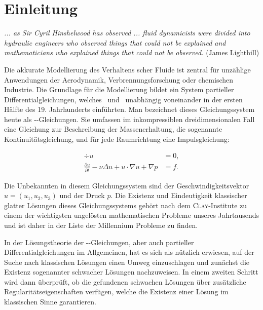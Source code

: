 \chapter*{Einleitung}

\begin{addmargin}[2em]{2em}%
  \textit{... as Sir Cyril Hinshelwood has observed ... fluid dynamicists
were divided into hydraulic engineers who observed things that
could not be explained and mathematicians who explained things
that could not be observed.} 
  \flushright(James Lighthill)
\end{addmargin}
\vspace{1.5cm}

Die akkurate Modellierung des Verhaltens \newton scher Fluide ist zentral für unzählige Anwendungen der Aerodynamik, Verbrennungsforschung oder chemischen Industrie.
Die Grundlage für die Modellierung bildet ein System partieller Differentialgleichungen, welches \navier\ und \stokes\ unabhängig voneinander in der ersten Hälfte des 19. Jahrhunderts einführten. 
Man bezeichnet dieses Gleichungssystem heute als \navier\hyp\stokes\hyp{}Gleichungen.
Sie umfassen im inkompressiblen dreidimensionalen Fall eine Gleichung zur Beschreibung der Massenerhaltung, die sogenannte Kontinuitätsgleichung, und für jede Raumrichtung eine Impulsgleichung:

\begin{align*}
  \div u &= 0, \\
  \frac{\partial u}{\partial t} - \nu \Delta u + u \cdot \nabla u + \nabla p &= f.
\end{align*}

Die Unbekannten in diesem Gleichungssystem sind der Geschwindigkeitsvektor $u = (u_1, u_2, u_3)$ und der Druck $p$.
Die Existenz und Eindeutigkeit klassischer glatter Lösungen dieses Gleichungssystems gehört nach dem \textsc{Clay}\hyp{}Institute zu einem der wichtigsten ungelösten mathematischen Probleme unseres Jahrtausends und ist daher in der Liste der Millennium Probleme zu finden.

In der Lösungstheorie der \navier\hyp\stokes\hyp{}Gleichungen, aber auch partieller Differentialgleichungen im Allgemeinen, hat es sich als nützlich erwiesen, auf der Suche nach klassischen Lösungen einen Umweg einzuschlagen und zunächst die Existenz sogenannter schwacher Lösungen nachzuweisen.
In einem zweiten Schritt wird dann überprüft, ob die gefundenen schwachen Lösungen über zusätzliche Regularitätseigenschaften verfügen, welche die Existenz einer Lösung im klassischen Sinne garantieren.

